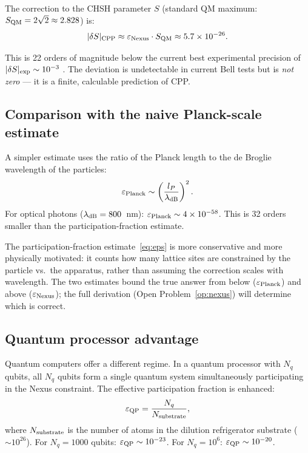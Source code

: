 \documentclass[11pt,letterpaper]{article}
\newcommand{\lP}{l_P}
\newcommand{\eps}{\varepsilon}
\begin{document}
The correction to the CHSH parameter $S$ (standard QM maximum:
$S_{\rm QM} = 2\sqrt{2} \approx 2.828$) is:
\begin{equation}
|\delta S|_{\rm CPP} \approx \eps_{\rm Nexus} \cdot S_{\rm QM}
\approx 5.7 \times 10^{-26}.
\label{eq:deltaS}
\end{equation}

This is 22 orders of magnitude below the current best experimental
precision of $|\delta S|_{\rm exp} \sim 10^{-3}$ \citep{li2018}.
The deviation is undetectable in current Bell tests but is
\emph{not zero} --- it is a finite, calculable prediction of CPP.

\subsection{Comparison with the naive Planck-scale estimate}

A simpler estimate uses the ratio of the Planck length to the de
Broglie wavelength of the particles:
\begin{equation}
\eps_{\rm Planck} \sim \left(\frac{\lP}{\lambda_{\rm dB}}\right)^2.
\label{eq:eps_planck}
\end{equation}
For optical photons ($\lambda_{\rm dB} = 800$~nm):
$\eps_{\rm Planck} \sim 4 \times 10^{-58}$.
This is 32 orders smaller than the participation-fraction estimate.

The participation-fraction estimate~\eqref{eq:eps} is more
conservative and more physically motivated: it counts how many
lattice sites are constrained by the particle vs.\ the apparatus,
rather than assuming the correction scales with wavelength.  The
two estimates bound the true answer from below ($\eps_{\rm Planck}$)
and above ($\eps_{\rm Nexus}$); the full derivation
(Open Problem~\ref{op:nexus}) will determine which is correct.

\subsection{Quantum processor advantage}

Quantum computers offer a different regime.  In a quantum processor
with $N_q$ qubits, all $N_q$ qubits form a single quantum system
simultaneously participating in the Nexus constraint.  The effective
participation fraction is enhanced:
\begin{equation}
\eps_{\rm QP} = \frac{N_q}{N_{\rm substrate}},
\label{eq:eps_QP}
\end{equation}
where $N_{\rm substrate}$ is the number of atoms in the dilution
refrigerator substrate ($\sim 10^{26}$).  For $N_q = 1000$ qubits:
$\eps_{\rm QP} \sim 10^{-23}$.  For $N_q = 10^6$: $\eps_{\rm QP}
\sim 10^{-20}$.
\end{document}
